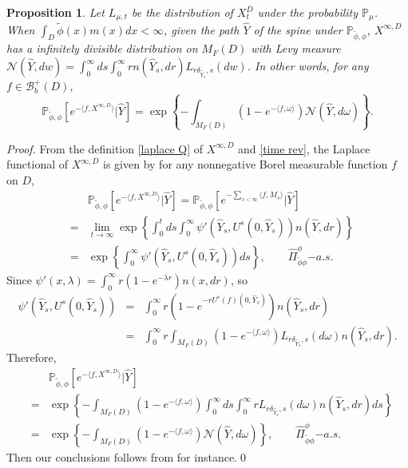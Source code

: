 \documentclass[12pt,a4paper]{amsart}
\theoremstyle{plain}
\newtheorem{prop}[thm]{Proposition}
\theoremstyle{definition}
\numberwithin{equation}{section}
\begin{document}
\begin{prop}\label{inf div}
Let $L_{\mu, t}$ be the distribution of $X^D_t$ under the probability $\mathbb P_\mu$.  When $\int_D\widetilde\phi(x)m(x)dx<\infty$, given the path $\widehat Y$ of the spine under $\mathbb P_{\widetilde\phi,\phi}$,  $X^{\infty,D}$ has a infinitely divisible distribution on $M_F(D)$ with Levy measure $\mathcal N(\widehat{Y}, dw)=\int_0^\infty ds\int_0^\infty r n(\widehat{Y}_s, dr)L_{r\delta_{\widehat{Y}_s}, s}(dw)$.  In other words, for any $f\in\mathcal B_b^+(D)$,
\[
\mathbb P_{\widetilde\phi,\phi}\left[e^{-\langle f,X^{\infty,D}\rangle }\big|\widehat{Y}\right]=\exp\left\{-\int_{M_F(D)}(1-e^{-\langle f,\omega\rangle })\mathcal N(\widehat{Y}, d\omega)\right\}.
\]
 \end{prop}
 \begin{proof}
 From the definition \eqref{laplace Q} of $X^{\infty,D}$ and \eqref{time rev}, the Laplace functional of $X^{\infty,D}$ is given by for any nonnegative Borel measurable function $f$ on $D$,
 \begin{eqnarray*}
 &&\mathbb P_{\widetilde\phi,\phi}\left[e^{-\langle f,X^{\infty,D}\rangle }\big|\widehat{Y}\right]=\mathbb P_{\widetilde\phi,\phi}\left[e^{-\sum_{s<\infty}\langle f,M_s\rangle }\big|\widehat{Y}\right]\\
& =&\lim_{t\rightarrow\infty}\exp\left\{\int_0^tds\int_0^\infty \psi'(\widehat Y_s, U^s(0,\widehat Y_s))n(\widehat Y, dr)\right\}\\
&=&\exp\left\{\int_0^\infty \psi'(\widehat Y_s, U^s(0,\widehat Y_s))ds\right\},\qquad \widehat\Pi_{\widetilde\phi\phi}^\phi{\mathrm -a.s.}
 \end{eqnarray*}
 Since $\psi'(x,\lambda)=\int_0^\infty r(1-e^{-\lambda r})n(x,dr)$,  so
 \begin{eqnarray*}
  \psi'(\widehat Y_s, U^s(0,\widehat Y_s))&=&\int_0^\infty r
  (1-e^{-rU^s(f)(0,\widehat Y_s)})n(\widehat Y_s,dr)\\
  &=&\int_0^\infty r\int_{M_F(D)}(1-e^{-\langle f,\omega\rangle })L_{r\delta_{\widehat{Y}_s}, s}(d\omega)n(\widehat Y_s,dr).
 \end{eqnarray*}
 Therefore,
\begin{eqnarray*}
&&\mathbb P_{\widetilde\phi,\phi}\left[e^{-\langle f,X^{\infty,D}\rangle }\big|\widehat{Y}\right]\\
&=&\exp\left\{-\int_{M_F(D)}(1-e^{-\langle f,\omega\rangle })\int_0^\infty ds\int_0^\infty rL_{r\delta_{\widehat{Y}_s}, s}(d\omega)n(\widehat Y_s,dr)ds\right\}\\
&=&\exp\left\{-\int_{M_F(D)}(1-e^{-\langle f,\omega\rangle })\mathcal N(\widehat{Y}, d\omega)\right\},\qquad \widehat\Pi_{\widetilde\phi\phi}^\phi{\mathrm -a.s.}
\end{eqnarray*}
 Then our conclusions follows from \cite[Theorem 3.4.1]{Dawson1992Infinitely} for instance.\qed
 \end{proof}
%
%
\end{document}
